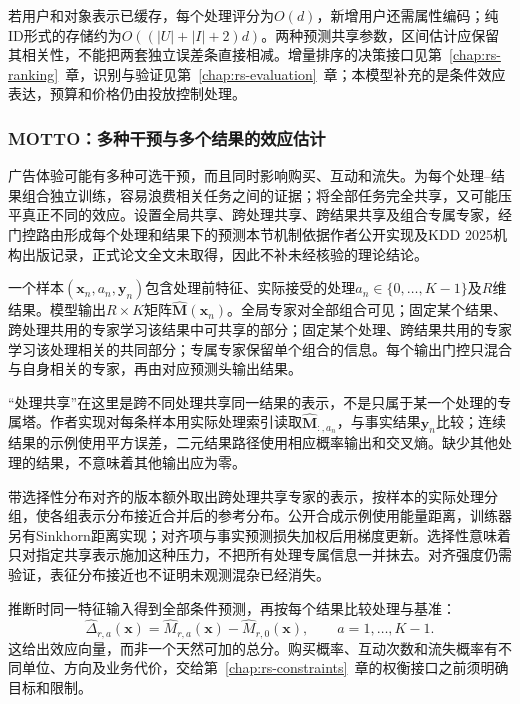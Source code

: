 若用户和对象表示已缓存，每个处理评分为$O(d)$，新增用户还需属性编码；纯ID形式的存储约为$O((|U|+|I|+2)d)$。两种预测共享参数，区间估计应保留其相关性，不能把两套独立误差条直接相减。增量排序的决策接口见第~\ref{chap:rs-ranking}~章，识别与验证见第~\ref{chap:rs-evaluation}~章；本模型补充的是条件效应表达，预算和价格仍由投放控制处理。

\Needspace{90mm}
\subsubsection{MOTTO：多种干预与多个结果的效应估计}
\label{sec:rs-advertising-motto}

广告体验可能有多种可选干预，而且同时影响购买、互动和流失。为每个处理--结果组合独立训练，容易浪费相关任务之间的证据；将全部任务完全共享，又可能压平真正不同的效应。设置全局共享、跨处理共享、跨结果共享及组合专属专家，经门控路由形成每个处理和结果下的预测本节机制依据作者公开实现及KDD 2025机构出版记录，正式论文全文未取得，因此不补未经核验的理论结论。

一个样本$(\bm{x}_n,a_n,\bm{y}_n)$包含处理前特征、实际接受的处理$a_n\in\{0,\ldots,K-1\}$及$R$维结果。模型输出$R\times K$矩阵$\widehat{\bm M}(\bm{x}_n)$。全局专家对全部组合可见；固定某个结果、跨处理共用的专家学习该结果中可共享的部分；固定某个处理、跨结果共用的专家学习该处理相关的共同部分；专属专家保留单个组合的信息。每个输出门控只混合与自身相关的专家，再由对应预测头输出结果。

“处理共享”在这里是跨不同处理共享同一结果的表示，不是只属于某一个处理的专属塔。作者实现对每条样本用实际处理索引读取$\widehat{\bm M}_{:,a_n}$，与事实结果$\bm y_n$比较；连续结果的示例使用平方误差，二元结果路径使用相应概率输出和交叉熵。缺少其他处理的结果，不意味着其他输出应为零。

带选择性分布对齐的版本额外取出跨处理共享专家的表示，按样本的实际处理分组，使各组表示分布接近合并后的参考分布。公开合成示例使用能量距离，训练器另有Sinkhorn距离实现；对齐项与事实预测损失加权后用梯度更新。选择性意味着只对指定共享表示施加这种压力，不把所有处理专属信息一并抹去。对齐强度仍需验证，表征分布接近也不证明未观测混杂已经消失。

推断时同一特征输入得到全部条件预测，再按每个结果比较处理与基准：
\[
  \widehat\Delta_{r,a}(\bm{x})
    =\widehat M_{r,a}(\bm{x})-\widehat M_{r,0}(\bm{x}),
      \qquad a=1,\ldots,K-1.
\]
这给出效应向量，而非一个天然可加的总分。购买概率、互动次数和流失概率有不同单位、方向及业务代价，交给第~\ref{chap:rs-constraints}~章的权衡接口之前须明确目标和限制。

